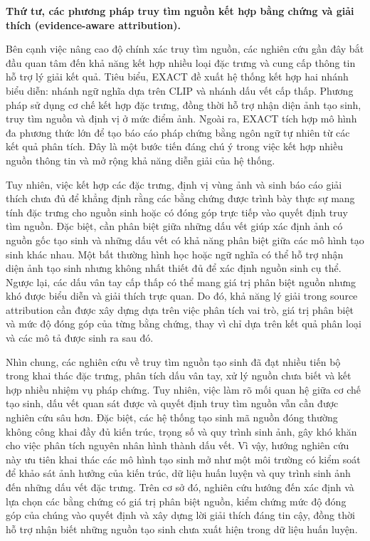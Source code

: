 \documentclass[12pt]{report}
\begin{document}
\medskip
\noindent\textbf{Thứ tư, các phương pháp truy tìm nguồn kết hợp bằng chứng và giải thích (evidence-aware attribution).}

Bên cạnh việc nâng cao độ chính xác truy tìm nguồn, các nghiên cứu gần đây bắt đầu quan tâm đến khả năng kết hợp nhiều loại đặc trưng và cung cấp thông tin hỗ trợ lý giải kết quả. Tiêu biểu, EXACT \cite{shi2026exact} đề xuất hệ thống kết hợp hai nhánh biểu diễn: nhánh ngữ nghĩa dựa trên CLIP và nhánh dấu vết cấp thấp. Phương pháp sử dụng cơ chế kết hợp đặc trưng, đồng thời hỗ trợ nhận diện ảnh tạo sinh, truy tìm nguồn và định vị ở mức điểm ảnh. Ngoài ra, EXACT tích hợp mô hình đa phương thức lớn để tạo báo cáo pháp chứng bằng ngôn ngữ tự nhiên từ các kết quả phân tích. Đây là một bước tiến đáng chú ý trong việc kết hợp nhiều nguồn thông tin và mở rộng khả năng diễn giải của hệ thống.

Tuy nhiên, việc kết hợp các đặc trưng, định vị vùng ảnh và sinh báo cáo giải thích chưa đủ để khẳng định rằng các bằng chứng được trình bày thực sự mang tính đặc trưng cho nguồn sinh hoặc có đóng góp trực tiếp vào quyết định truy tìm nguồn. Đặc biệt, cần phân biệt giữa những dấu vết giúp xác định ảnh có nguồn gốc tạo sinh và những dấu vết có khả năng phân biệt giữa các mô hình tạo sinh khác nhau. Một bất thường hình học hoặc ngữ nghĩa có thể hỗ trợ nhận diện ảnh tạo sinh nhưng không nhất thiết đủ để xác định nguồn sinh cụ thể. Ngược lại, các dấu vân tay cấp thấp có thể mang giá trị phân biệt nguồn nhưng khó được biểu diễn và giải thích trực quan. Do đó, khả năng lý giải trong source attribution cần được xây dựng dựa trên việc phân tích vai trò, giá trị phân biệt và mức độ đóng góp của từng bằng chứng, thay vì chỉ dựa trên kết quả phân loại và các mô tả được sinh ra sau đó.

Nhìn chung, các nghiên cứu về truy tìm nguồn tạo sinh đã đạt nhiều tiến bộ trong khai thác đặc trưng, phân tích dấu vân tay, xử lý nguồn chưa biết và kết hợp nhiều nhiệm vụ pháp chứng. Tuy nhiên, việc làm rõ mối quan hệ giữa cơ chế tạo sinh, dấu vết quan sát được và quyết định truy tìm nguồn vẫn cần được nghiên cứu sâu hơn. Đặc biệt, các hệ thống tạo sinh mã nguồn đóng thường không công khai đầy đủ kiến trúc, trọng số và quy trình sinh ảnh, gây khó khăn cho việc phân tích nguyên nhân hình thành dấu vết. Vì vậy, hướng nghiên cứu này ưu tiên khai thác các mô hình tạo sinh mở như một môi trường có kiểm soát để khảo sát ảnh hưởng của kiến trúc, dữ liệu huấn luyện và quy trình sinh ảnh đến những dấu vết đặc trưng. Trên cơ sở đó, nghiên cứu hướng đến xác định và lựa chọn các bằng chứng có giá trị phân biệt nguồn, kiểm chứng mức độ đóng góp của chúng vào quyết định và xây dựng lời giải thích đáng tin cậy, đồng thời hỗ trợ nhận biết những nguồn tạo sinh chưa xuất hiện trong dữ liệu huấn luyện.
\end{document}
